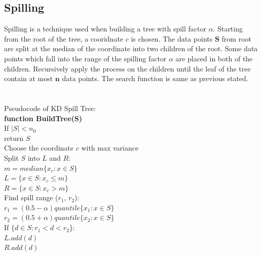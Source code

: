 \documentclass[paper=letter, fontsize=12pt]{article} %
\begin{document}
\subsection{Spilling}
Spilling is a technique used when building a tree with spill factor $\alpha$. Starting from the root of the tree, a cooridnate $c$ is chosen. The data points $\mathbf S$ from root are split at the median of the coordinate into two children of the root. Some data points which fall into the range of the spilling factor $\alpha$ are placed in both of the children. Recursively apply the process on the children until the leaf of the tree contain at most $\mathbf n$ data points. The search function is same as previous stated.\\
\\~\\
Pseudocode of KD Spill Tree:\\
\hspace*{1em} \textbf{function BuildTree(S)}\\
\hspace*{2em} If $|S| < n_0$\\
\hspace*{3em} return $S$\\
\hspace*{2em} Choose the coordinate $c$ with max variance\\
\hspace*{2em} Split $S$ into $L$ and $R$:\\
\hspace*{3em} $m = median \{ x_c: x \in S\}$\\
\hspace*{3em} $L = \{ x \in S: x_c \leq m\}$\\
\hspace*{3em} $R = \{ x \in S: x_c > m\}$\\
\hspace*{2em} Find spill range ($r_1$, $r_2$):\\
\hspace*{3em} $r_1 = (0.5-\alpha)quantile  \{ x_1: x \in S\}$\\
\hspace*{3em} $r_2 = (0.5+\alpha)quantile \{ x_2: x \in S\}$\\
\hspace*{2em} If $\{d \in S:  r_1 < d < r_2\}$:\\
\hspace*{3em} $L.add(d)$\\
\hspace*{3em} $R.add(d)$\\
\end{document}
